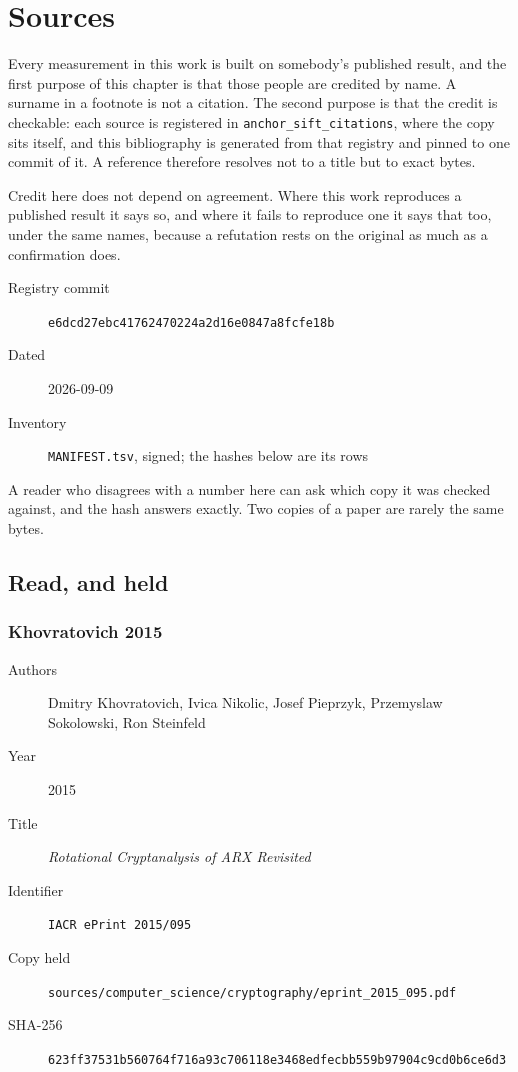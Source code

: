 \chapter{Sources}

Every measurement in this work is built on somebody's published result, and the
first purpose of this chapter is that those people are credited by name. A surname
in a footnote is not a citation. The second purpose is that the credit is checkable:
each source is registered in \texttt{anchor\_sift\_citations}, where the copy sits
itself, and this bibliography is generated from that registry and pinned to one
commit of it. A reference therefore resolves not to a title but to exact bytes.

Credit here does not depend on agreement. Where this work reproduces a published
result it says so, and where it fails to reproduce one it says that too, under the
same names, because a refutation rests on the original as much as a confirmation does.

\begin{description}
\item[Registry commit] \texttt{e6dcd27ebc41762470224a2d16e0847a8fcfe18b}
\item[Dated] 2026-09-09
\item[Inventory] \texttt{MANIFEST.tsv}, signed; the hashes below are its rows
\end{description}

A reader who disagrees with a number here can ask which copy it was checked
against, and the hash answers exactly. Two copies of a paper are rarely the same
bytes.

\section{Read, and held}

\subsection*{Khovratovich 2015}
\begin{description}
\item[Authors] Dmitry Khovratovich, Ivica Nikolic, Josef Pieprzyk, Przemyslaw Sokolowski, Ron Steinfeld
\item[Year] 2015
\item[Title] \emph{Rotational Cryptanalysis of ARX Revisited}
\item[Identifier] \texttt{IACR ePrint 2015/095}
\item[Copy held] \texttt{sources/computer\_science/cryptography/eprint\_2015\_095.pdf}
\item[SHA-256] {\footnotesize\texttt{623ff37531b560764f716a93c706118e3468edfecbb559b97904c9cd0b6ce6d3}}
\end{description}

